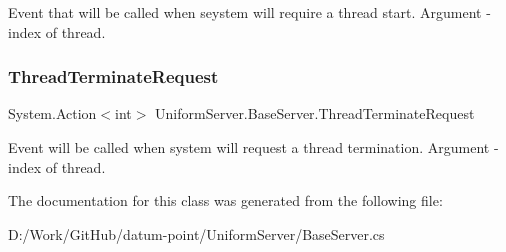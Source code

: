 Event that will be called when seystem will require a thread start. Argument -\/ index of thread. 

\mbox{\label{class_uniform_server_1_1_base_server_a889c3aaa1cca7f4a9a4e32617516f4be}} 
\subsubsection{\texorpdfstring{Thread\+Terminate\+Request}{ThreadTerminateRequest}}
{\footnotesize\ttfamily System.\+Action$<$int$>$ Uniform\+Server.\+Base\+Server.\+Thread\+Terminate\+Request\hspace{0.3cm}{\ttfamily [static]}}



Event will be called when system will request a thread termination. Argument -\/ index of thread. 



The documentation for this class was generated from the following file\+:\begin{DoxyCompactItemize}
\item 
D\+:/\+Work/\+Git\+Hub/datum-\/point/\+Uniform\+Server/Base\+Server.\+cs\end{DoxyCompactItemize}
